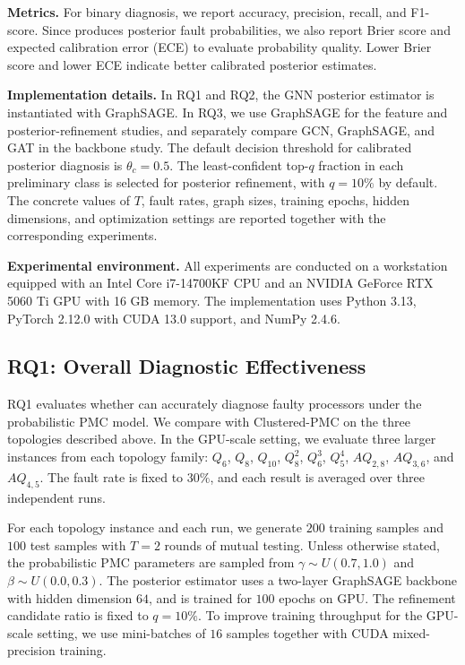 \noindent \textbf{Metrics.}
For binary diagnosis, we report accuracy, precision, recall, and F1-score. Since \tool produces posterior fault probabilities, we also report Brier score and expected calibration error (ECE) to evaluate probability quality. Lower Brier score and lower ECE indicate better calibrated posterior estimates.

\noindent \textbf{Implementation details.}
In RQ1 and RQ2, the GNN posterior estimator is instantiated with GraphSAGE. In RQ3, we use GraphSAGE for the feature and posterior-refinement studies, and separately compare GCN, GraphSAGE, and GAT in the backbone study. The default decision threshold for calibrated posterior diagnosis is $\theta_c=0.5$. The least-confident top-$q$ fraction in each preliminary class is selected for posterior refinement, with $q=10\%$ by default. The concrete values of $T$, fault rates, graph sizes, training epochs, hidden dimensions, and optimization settings are reported together with the corresponding experiments.

\noindent \textbf{Experimental environment.}
All experiments are conducted on a workstation equipped with an Intel Core i7-14700KF CPU and an NVIDIA GeForce RTX 5060 Ti GPU with 16 GB memory. The implementation uses Python 3.13, PyTorch 2.12.0 with CUDA 13.0 support, and NumPy 2.4.6. 

\subsection{RQ1: Overall Diagnostic Effectiveness}
\label{subsec:rq1}

RQ1 evaluates whether \tool can accurately diagnose faulty processors under the probabilistic PMC model. We compare \tool with Clustered-PMC on the three topologies described above. In the GPU-scale setting, we evaluate three larger instances from each topology family: $Q_6$, $Q_8$, $Q_{10}$, $Q_8^2$, $Q_6^3$, $Q_5^4$, $AQ_{2,8}$, $AQ_{3,6}$, and $AQ_{4,5}$. The fault rate is fixed to $30\%$, and each result is averaged over three independent runs.

For each topology instance and each run, we generate $200$ training samples and $100$ test samples with $T=2$ rounds of mutual testing. Unless otherwise stated, the probabilistic PMC parameters are sampled from $\gamma \sim U(0.7, 1.0)$ and $\beta \sim U(0.0, 0.3)$. The posterior estimator uses a two-layer GraphSAGE backbone with hidden dimension $64$, and is trained for $100$ epochs on GPU. The refinement candidate ratio is fixed to $q=10\%$. To improve training throughput for the GPU-scale setting, we use mini-batches of $16$ samples together with CUDA mixed-precision training.


